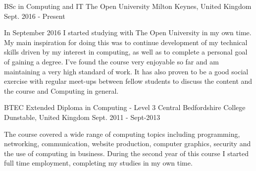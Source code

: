 

\begin{cventries}

  \cventry
    {BSc in Computing and IT} %
    {The Open University} %
    {Milton Keynes, United Kingdom} %
    {Sept. 2016 - Present} %
    {
      \begin{cvitems} %
        {In September 2016 I started studying with The Open University in my own time. My main inspiration for doing this was to continue development of my technical skills driven by my interest in computing, as well as to complete a personal goal of gaining a degree. I’ve found the course very enjoyable so far and am maintaining a very high standard of work. It has also proven to be a good social exercise with regular meet-ups between fellow students to discuss the content and the course and Computing in general.}
      \end{cvitems}
    }

  \cventry
    {BTEC Extended Diploma in Computing - Level 3} %
    {Central Bedfordshire College } %
    {Dunstable, United Kingdom} %
    {Sept. 2011 - Sept-2013} %
    {
      \begin{cvitems} %
        {The course covered a wide range of computing topics including programming, networking, communication, website production, computer graphics, security and the use of computing in business. During the second year of this course I started full time employment, completing my studies in my own time.}
      \end{cvitems}
    }

\end{cventries}
